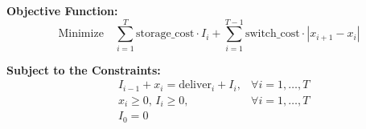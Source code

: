 \documentclass{article}
\begin{document}
\textbf{Objective Function:}
\[
\text{Minimize} \quad \sum_{i=1}^{T} \text{storage\_cost} \cdot I_i + \sum_{i=1}^{T-1} \text{switch\_cost} \cdot |x_{i+1} - x_i|
\]

\textbf{Subject to the Constraints:}
\begin{align*}
& I_{i-1} + x_i = \text{deliver}_i + I_i, & \forall i = 1, \ldots, T \\
& x_i \geq 0, \, I_i \geq 0, & \forall i = 1, \ldots, T \\
& I_0 = 0
\end{align*}
\end{document}
